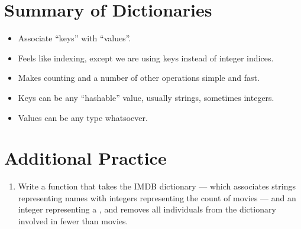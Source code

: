 \documentclass[letterpaper,10pt,english]{sphinxmanual}
\begin{document}
\section{Summary of Dictionaries}
\label{\detokenize{lecture_notes/lec16_dictionaries1:summary-of-dictionaries}}\begin{itemize}
\item {} 
Associate “keys” with “values”.

\item {} 
Feels like indexing, except we are using keys instead of integer
indices.

\item {} 
Makes counting and a number of other operations simple and fast.

\item {} 
Keys can be any “hashable” value, usually strings, sometimes
integers.

\item {} 
Values can be any type whatsoever.

\end{itemize}


\section{Additional Practice}
\label{\detokenize{lecture_notes/lec16_dictionaries1:additional-practice}}\begin{enumerate}
\def\theenumi{\arabic{enumi}}
\def\labelenumi{\theenumi .}
\makeatletter\def\p@enumii{\p@enumi \theenumi .}\makeatother
\item {} 
Write a function that takes the IMDB dictionary — which associates
strings representing names with integers representing the count of
movies — and an integer representing a , and removes all
individuals from the dictionary involved in fewer than 
movies.

\end{enumerate}
\end{document}
